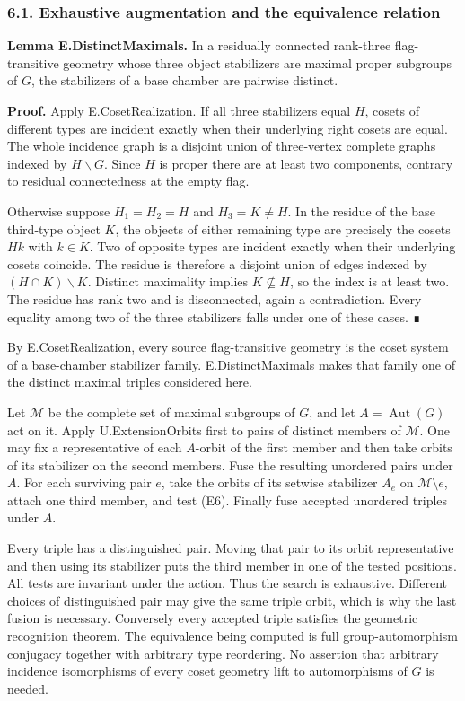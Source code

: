 \documentclass[
  11pt,
  a4paper,
]{article}
\begin{document}
\subsubsection{6.1. Exhaustive augmentation and the equivalence
relation}\label{exhaustive-augmentation-and-the-equivalence-relation}

\textbf{Lemma E.DistinctMaximals.} In a residually connected rank-three
flag-transitive geometry whose three object stabilizers are maximal
proper subgroups of \(G\), the stabilizers of a base chamber are
pairwise distinct.

\textbf{Proof.} Apply E.CosetRealization. If all three stabilizers equal
\(H\), cosets of different types are incident exactly when their
underlying right cosets are equal. The whole incidence graph is a
disjoint union of three-vertex complete graphs indexed by
\(H\backslash G\). Since \(H\) is proper there are at least two
components, contrary to residual connectedness at the empty flag.

Otherwise suppose \(H_1=H_2=H\) and \(H_3=K\ne H\). In the residue of
the base third-type object \(K\), the objects of either remaining type
are precisely the cosets \(Hk\) with \(k\in K\). Two of opposite types
are incident exactly when their underlying cosets coincide. The residue
is therefore a disjoint union of edges indexed by
\((H\cap K)\backslash K\). Distinct maximality implies
\(K\nsubseteq H\), so the index is at least two. The residue has rank
two and is disconnected, again a contradiction. Every equality among two
of the three stabilizers falls under one of these cases. ∎

By E.CosetRealization, every source flag-transitive geometry is the
coset system of a base-chamber stabilizer family. E.DistinctMaximals
makes that family one of the distinct maximal triples considered here.

Let \(\mathcal M\) be the complete set of maximal subgroups of \(G\),
and let \(A=\operatorname{Aut}(G)\) act on it. Apply U.ExtensionOrbits
first to pairs of distinct members of \(\mathcal M\). One may fix a
representative of each \(A\)-orbit of the first member and then take
orbits of its stabilizer on the second members. Fuse the resulting
unordered pairs under \(A\). For each surviving pair \(e\), take the
orbits of its setwise stabilizer \(A_e\) on \(\mathcal M\setminus e\),
attach one third member, and test (E6). Finally fuse accepted unordered
triples under \(A\).

Every triple has a distinguished pair. Moving that pair to its orbit
representative and then using its stabilizer puts the third member in
one of the tested positions. All tests are invariant under the action.
Thus the search is exhaustive. Different choices of distinguished pair
may give the same triple orbit, which is why the last fusion is
necessary. Conversely every accepted triple satisfies the geometric
recognition theorem. The equivalence being computed is full
group-automorphism conjugacy together with arbitrary type reordering. No
assertion that arbitrary incidence isomorphisms of every coset geometry
lift to automorphisms of \(G\) is needed.
\end{document}
